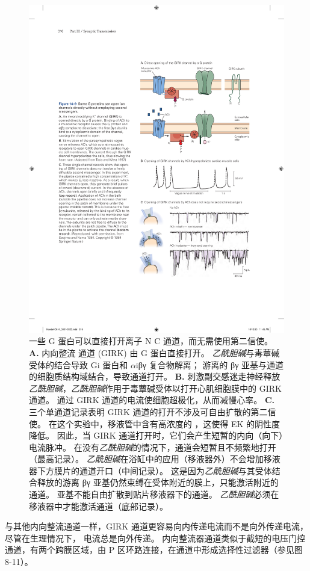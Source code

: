 \begin{figure}[htbp]
	\centering
	\includegraphics[width=0.65\linewidth]{chap14/fig_14_9}
	\caption{一些 G 蛋白可以直接打开离子 N C 通道，而无需使用第二信使。
		\textbf{A.} 内向整流  通道 (GIRK) 由 G 蛋白直接打开。
		\textit{乙酰胆碱}与毒蕈碱受体的结合导致 Gi 蛋白和 $\alpha$iβγ 复合物解离；
		游离的 βγ 亚基与通道的细胞质结构域结合，导致通道打开。
		\textbf{B.} 刺激副交感迷走神经释放\textit{乙酰胆碱}，\textit{乙酰胆碱}作用于毒蕈碱受体以打开心肌细胞膜中的 GIRK 通道。
		通过 GIRK 通道的电流使细胞超极化，从而减慢心率\cite{toda1967interactions}。
		\textbf{C.} 三个单通道记录表明 GIRK 通道的打开不涉及可自由扩散的第二信使。
		在这个实验中，移液管中含有高浓度的 ，这使得 EK 的阴性度降低。
		因此，当 GIRK 通道打开时，它们会产生短暂的内向（向下）电流脉冲。
		在没有\textit{乙酰胆碱}的情况下，通道会短暂且不频繁地打开（最高记录）。
		\textit{乙酰胆碱}在浴缸中的应用（移液器外）不会增加移液器下方膜片的通道开口（中间记录）。
		这是因为\textit{乙酰胆碱}与其受体结合释放的游离 βγ 亚基仍然束缚在受体附近的膜上，只能激活附近的通道。
		亚基不能自由扩散到贴片移液器下的通道。
		\textit{乙酰胆碱}必须在移液器中才能激活通道（底部记录）\cite{soejima1984mode}。}
	\label{fig:14_9}
\end{figure}


与其他内向整流通道一样，GIRK 通道更容易向内传递电流而不是向外传递电流，尽管在生理情况下， 电流总是向外传递。
内向整流器通道类似于截短的电压门控  通道，有两个跨膜区域，由 P 区环路连接，在通道中形成选择性过滤器（参见图 8-11）。


